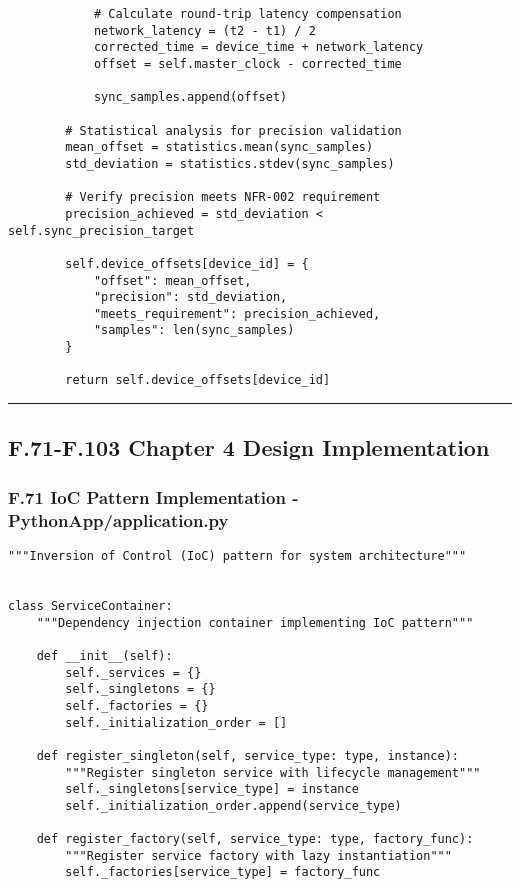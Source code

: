 \documentclass[11pt,a4paper]{report}
\begin{document}
{{\begin{verbatim}
            # Calculate round-trip latency compensation
            network_latency = (t2 - t1) / 2
            corrected_time = device_time + network_latency
            offset = self.master_clock - corrected_time

            sync_samples.append(offset)

        # Statistical analysis for precision validation
        mean_offset = statistics.mean(sync_samples)
        std_deviation = statistics.stdev(sync_samples)

        # Verify precision meets NFR-002 requirement
        precision_achieved = std_deviation < self.sync_precision_target

        self.device_offsets[device_id] = {
            "offset": mean_offset,
            "precision": std_deviation,
            "meets_requirement": precision_achieved,
            "samples": len(sync_samples)
        }

        return self.device_offsets[device_id]
\end{verbatim}

\hrule

\subsection{F.71-F.103 Chapter 4 Design Implementation}

\subsubsection{F.71 IoC Pattern Implementation - PythonApp/application.py}

\begin{verbatim}
"""Inversion of Control (IoC) pattern for system architecture"""


class ServiceContainer:
    """Dependency injection container implementing IoC pattern"""

    def __init__(self):
        self._services = {}
        self._singletons = {}
        self._factories = {}
        self._initialization_order = []

    def register_singleton(self, service_type: type, instance):
        """Register singleton service with lifecycle management"""
        self._singletons[service_type] = instance
        self._initialization_order.append(service_type)

    def register_factory(self, service_type: type, factory_func):
        """Register service factory with lazy instantiation"""
        self._factories[service_type] = factory_func


\end{verbatim}}}
\end{document}
